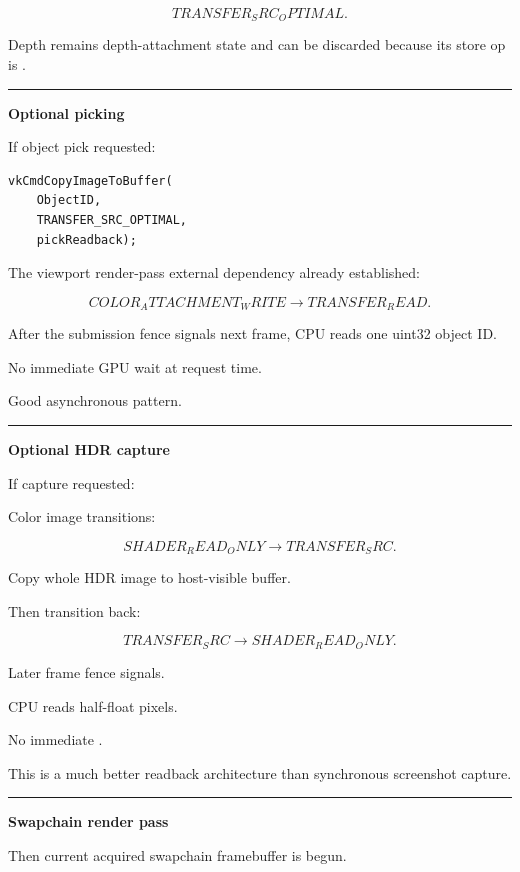 \[
TRANSFER_SRC_OPTIMAL.
\]

Depth remains depth-attachment state and can be discarded because its store op is .

\begin{center}\rule{0.5\linewidth}{0.5pt}\end{center}

\textbf{Optional picking}

If object pick requested:

\begin{verbatim}
vkCmdCopyImageToBuffer(
    ObjectID,
    TRANSFER_SRC_OPTIMAL,
    pickReadback);
\end{verbatim}

The viewport render-pass external dependency already established:

\[
COLOR_ATTACHMENT_WRITE
\rightarrow
TRANSFER_READ.
\]

After the submission fence signals next frame, CPU reads one uint32 object ID.

No immediate GPU wait at request time.

Good asynchronous pattern.

\begin{center}\rule{0.5\linewidth}{0.5pt}\end{center}

\textbf{Optional HDR capture}

If capture requested:

Color image transitions:

\[
SHADER_READ_ONLY
\rightarrow
TRANSFER_SRC.
\]

Copy whole HDR image to host-visible buffer.

Then transition back:

\[
TRANSFER_SRC
\rightarrow
SHADER_READ_ONLY.
\]

Later frame fence signals.

CPU reads half-float pixels.

No immediate .

This is a much better readback architecture than synchronous screenshot capture.

\begin{center}\rule{0.5\linewidth}{0.5pt}\end{center}

\textbf{Swapchain render pass}

Then current acquired swapchain framebuffer is begun.

